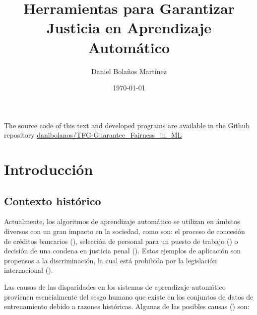 \documentclass[oneside,openright,titlepage,numbers=noenddot,openany,headinclude,footinclude=true,
cleardoublepage=empty,abstractoff,BCOR=5mm,paper=a4,fontsize=12pt,main=spanish]{scrreprt}
\author{Daniel Bolaños Martínez}
\date{\today}
\title{Herramientas para Garantizar \\Justicia en Aprendizaje Automático}
\begin{document}
\maketitle



\newpage
\vspace*{\fill}
\doclicenseThis
The source code of this text and developed programs are available in the Github repository \href{https://github.com/danibolanos/TFG-Guarantee_Fairness_in_ML.git}{danibolanos/TFG-Guarantee\_Fairness\_in\_ML}









\tableofcontents


\chapter{Introducción}

\section{Contexto histórico}

Actualmente, los algoritmos de aprendizaje automático se utilizan en ámbitos diversos con un gran impacto en la sociedad, como son: el proceso de concesión de créditos bancarios (\cite{prestamo2018}), selección de personal para un puesto de trabajo (\cite{contratar2015}) o decisión de una condena en justicia penal (\cite{condena2016}). Estos ejemplos de aplicación son propensos a la discriminación, la cual está prohibida por la legislación internacional (\cite{ley1964}). 

Las causas de las disparidades en los sistemas de aprendizaje automático provienen esencialmente del sesgo humano que existe en los conjuntos de datos de entrenamiento debido a razones históricas. Algunas de las posibles causas (\cite{bigdata2016}) son:
\end{document}
